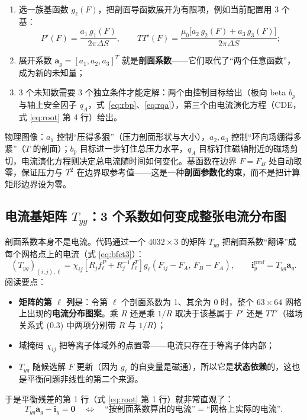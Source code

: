 \documentclass[12pt,fontset=none]{ctexart}
\numberwithin{equation}{section}
\numberwithin{table}{section}
\numberwithin{figure}{section}
\begin{document}
\begin{enumerate}[nosep]
  \item 选一族基函数 $g_\ell(F)$，把剖面导函数展开为有限项，例如当前配置用 3 个基：
  \[
    P'(F)=\frac{a_1\,g_1(F)}{2\pi\Delta S},\qquad
    TT'(F)=\frac{\mu_0\bigl[a_2\,g_2(F)+a_3\,g_3(F)\bigr]}{2\pi\Delta S};
  \]
  \item 展开系数 $\bm{a}_g=[a_1,a_2,a_3]^T$ 就是\textbf{剖面系数}——它们取代了``两个任意函数''，成为新的未知量；
  \item 3 个未知数需要 3 个独立条件才能定解：两个由控制目标给出（极向 beta $b_p$ 与轴上安全因子 $q_A$，式~\eqref{eq:rbp}、\eqref{eq:rqa}），第三个由电流演化方程（CDE，式 \eqref{eq:root} 第 4 行）给出。
\end{enumerate}

物理图像：$a_1$ 控制``压得多狠''（压力剖面形状与大小），$a_2,a_3$ 控制``环向场绷得多紧''（$T$ 的剖面）；$b_p$ 目标进一步钉住总压力水平，$q_A$ 目标钉住磁轴附近的磁场剪切，电流演化方程则决定总电流随时间如何变化。基函数在边界 $F=F_B$ 处自动取零，保证压力与 $T^2$ 在边界取参考值——这是一种\textbf{剖面参数化约束}，而不是把计算矩形边界设为零。

\subsection{电流基矩阵 $T_{yg}$：3 个系数如何变成整张电流分布图}\label{sec:primer-basis}

剖面系数本身不是电流。代码通过一个 $4032\times3$ 的矩阵 $T_{yg}$ 把剖面系数``翻译''成每个网格点上的电流（式 \eqref{eq:bfct3}）：
\[
  (T_{yg})_{(i,j),\ell}=\chi_{ij}\left[R_jf^P_\ell+R_j^{-1}f^T_\ell\right]g_\ell(F_{ij}-F_A,\,F_B-F_A),
  \qquad \bm{i}_y^{\mathrm{prof}}=T_{yg}\bm{a}_g .
\]
阅读要点：

\begin{itemize}[nosep]
  \item \textbf{矩阵的第 $\ell$ 列}是：令第 $\ell$ 个剖面系数为 1、其余为 0 时，整个 $63\times64$ 网格上出现的\textbf{电流分布图案}。乘 $R$ 还是乘 $1/R$ 取决于该基属于 $P'$ 还是 $TT'$（磁场关系式 (0.3) 中两项分别带 $R$ 与 $1/R$）；
  \item 域掩码 $\chi_{ij}$ 把等离子体域外的点置零——电流只存在于等离子体内部；
  \item $T_{yg}$ 随候选解 $F$ 更新（因为 $g_\ell$ 的自变量是磁通），所以它是\textbf{状态依赖}的，这也是平衡问题非线性的第二个来源。
\end{itemize}

于是平衡残差的第 1 行（式 \eqref{eq:root} 第 1 行）就非常直观了：
\[
  T_{yg}\bm{a}_g-\bm{i}_y=\bm{0}
  \quad\Longleftrightarrow\quad
  \text{``按剖面系数算出的电流''}=\text{``网格上实际的电流''}.
\]
\end{document}

